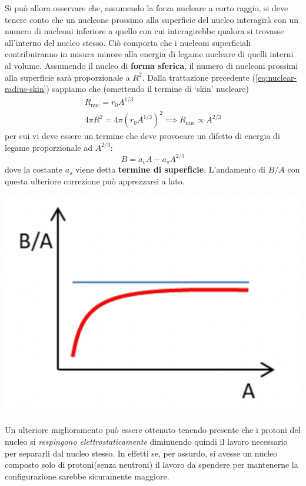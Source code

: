Si può allora osservare che, assumendo la forza nucleare a
corto raggio, si deve tenere conto che un nucleone prossimo alla
superficie del nucleo interagirà con un numero di nucleoni inferiore a
quello con cui interagirebbe qualora si trovasse all'interno del nucleo
stesso.
Ciò comporta che i nucleoni superficiali contribuiranno in
misura minore alla energia di legame nucleare di quelli interni al
volume.
Assumendo il nucleo di \textbf{forma sferica}, il numero di
nucleoni prossimi alla superficie sarà proporzionale a \(R^{2}\).
Dalla trattazione precedente (\ref{eq:nuclear-radius-skin}) sappiamo che (omettendo il termine di `skin'
nucleare) \begin{gather*}
	R_{\text{nuc}} = r_{0}A^{1/3}\\
	4 \pi R^{2} = 4 \pi (r_{0}A^{1/3})^2 \implies R_{\text{nuc}} \propto A^{2/3}
\end{gather*} per cui vi deve essere un termine che deve provocare un difetto di
energia di legame proporzionale ad \(A^{2/3}\): \[
	B = a_{v}A - a_{s}A^{2/3}
\] dove la costante \(a_{s}\) viene detta \textbf{termine di
	superficie}.
L'andamento di \(B / A\) con questa ulteriore correzione
può apprezzarsi a lato.
\begin{marginfigure}
	\includegraphics{figs/goccia2}
	\label{fig:goccia2}
\end{marginfigure}
\bigskip

Un ulteriore miglioramento può essere ottenuto tenendo presente che i
protoni del nucleo si \emph{respingono elettrostaticamente} diminuendo
quindi il lavoro necessario per separarli dal nucleo stesso.
In effetti
se, per assurdo, si avesse un nucleo composto solo di protoni(senza
neutroni) il lavoro da spendere per mantenerne la configurazione sarebbe
sicuramente maggiore.

